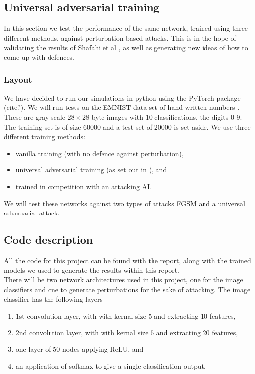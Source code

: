 \subsection{Universal adversarial training}

\setlength\parindent{0pt}

In this section we test the performance of the same network, trained using three different methods, against perturbation based attacks. This is in the hope of validating the results of Shafahi et al \cite{shafahi_universal_2018}, as well as generating new ideas of how to come up with defences.

\subsubsection{Layout}

We have decided to run our simulations in python using the PyTorch package (cite?). We will run tests on the EMNIST data set of hand written numbers \cite{EMNIST_data}. These are gray scale $28 \times 28$ byte images with 10 classifications, the digits 0-9. The training set is of size 60000 and a test set of 20000 is set aside. We use three different training methods:

\begin{itemize}
	\item vanilla training (with no defence against perturbation),
	\item universal adversarial training (as set out in \cite{shafahi_universal_2018}), and
	\item trained in competition with an attacking AI.
\end{itemize}

We will test these networks against two types of attacks FGSM and a universal adversarial attack.

\subsection{Code description}

All the code for this project can be found with the report, along with the trained models we used to generate the results within this report.\\ 

There will be two network architectures used in this project, one for the image classifiers and one to generate perturbations for the sake of attacking. The image classifier has the following layers

\begin{enumerate}
	\item 1st convolution layer, with with kernal size 5 and extracting 10 features,
	\item 2nd convolution layer, with with kernal size 5 and extracting 20 features,
	\item one layer of 50 nodes applying ReLU, and
	\item an application of softmax to give a single classification output.
\end{enumerate}

